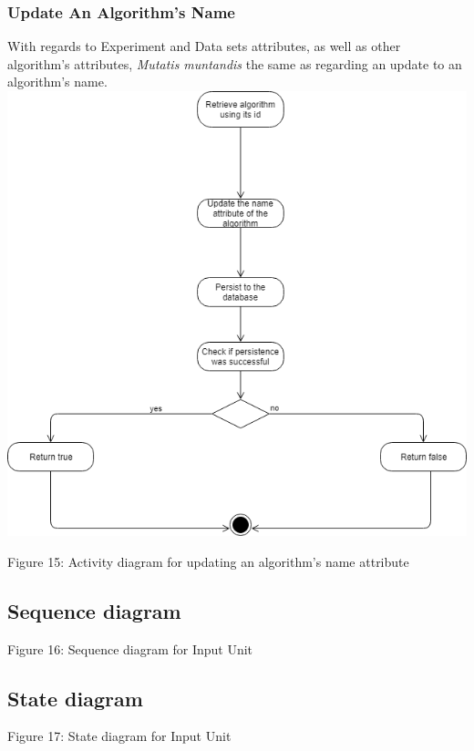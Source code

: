     \subsubsection{Update An Algorithm's Name}
    \par With regards to Experiment and Data sets attributes, as well as other algorithm's attributes,
{ \textit{Mutatis muntandis} the same as regarding an update to an algorithm's name.} \newline \newline
    \includegraphics[width=\textwidth]{input_unit/images/update_algorithm_activity_diagram.png}
	\begin{center}
	    \small{Figure 15: Activity diagram for updating an algorithm's name attribute }
    \end{center}


\subsection{Sequence diagram}
	\begin{center}
	    \small{Figure 16: Sequence diagram for Input Unit}
    \end{center}

\subsection{State diagram}
	\begin{center}
	    \small{Figure 17: State diagram for Input Unit}
    \end{center}

